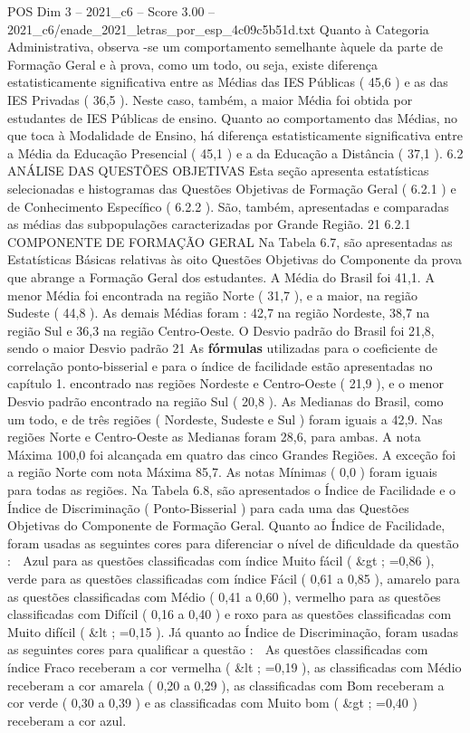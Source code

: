 \begin{textsample}{POS Dim 3 – 2021\_c6 – Score 3.00 – 2021\_c6/enade\_2021\_letras\_por\_esp\_4c09c5b51d.txt}
Quanto à Categoria Administrativa, observa -se um comportamento semelhante àquele da parte de Formação Geral e à prova, como um todo, ou seja, existe diferença estatisticamente significativa entre as Médias das IES Públicas ( 45,6 ) e as das IES Privadas ( 36,5 ).
Neste caso, também, a maior Média foi obtida por estudantes de IES Públicas de ensino.
Quanto ao comportamento das Médias, no que toca à Modalidade de Ensino, há diferença estatisticamente significativa entre a Média da Educação Presencial ( 45,1 ) e a da Educação a Distância ( 37,1 ). 6.2 ANÁLISE DAS QUESTÕES OBJETIVAS Esta seção apresenta estatísticas selecionadas e histogramas das Questões Objetivas de Formação Geral ( 6.2.1 ) e de Conhecimento Específico ( 6.2.2 ).
São, também, apresentadas e comparadas as médias das subpopulações caracterizadas por Grande Região. 21 6.2.1 COMPONENTE DE FORMAÇÃO GERAL Na Tabela 6.7, são apresentadas as Estatísticas Básicas relativas às oito Questões Objetivas do Componente da prova que abrange a Formação Geral dos estudantes.
A Média do Brasil foi 41,1.
A menor Média foi encontrada na região Norte ( 31,7 ), e a maior, na região Sudeste ( 44,8 ).
As demais Médias foram : 42,7 na região Nordeste, 38,7 na região Sul e 36,3 na região Centro-Oeste.
O Desvio padrão do Brasil foi 21,8, sendo o maior Desvio padrão 21 As \textbf{fórmulas} utilizadas para o coeficiente de correlação ponto-bisserial e para o índice de facilidade estão apresentadas no capítulo 1. encontrado nas regiões Nordeste e Centro-Oeste ( 21,9 ), e o menor Desvio padrão encontrado na região Sul ( 20,8 ).
As Medianas do Brasil, como um todo, e de três regiões ( Nordeste, Sudeste e Sul ) foram iguais a 42,9.
Nas regiões Norte e Centro-Oeste as Medianas foram 28,6, para ambas.
A nota Máxima 100,0 foi alcançada em quatro das cinco Grandes Regiões.
A exceção foi a região Norte com nota Máxima 85,7.
As notas Mínimas ( 0,0 ) foram iguais para todas as regiões.
Na Tabela 6.8, são apresentados o Índice de Facilidade e o Índice de Discriminação ( Ponto-Bisserial ) para cada uma das Questões Objetivas do Componente de Formação Geral.
Quanto ao Índice de Facilidade, foram usadas as seguintes cores para diferenciar o nível de dificuldade da questão :  Azul para as questões classificadas com índice Muito fácil ( \&gt ; =0,86 ), verde para as questões classificadas com índice Fácil ( 0,61 a 0,85 ), amarelo para as questões classificadas com Médio ( 0,41 a 0,60 ), vermelho para as questões classificadas com Difícil ( 0,16 a 0,40 ) e roxo para as questões classificadas com Muito difícil ( \&lt ; =0,15 ).
Já quanto ao Índice de Discriminação, foram usadas as seguintes cores para qualificar a questão :  As questões classificadas com índice Fraco receberam a cor vermelha ( \&lt ; =0,19 ), as classificadas com Médio receberam a cor amarela ( 0,20 a 0,29 ), as classificadas com Bom receberam a cor verde ( 0,30 a 0,39 ) e as classificadas com Muito bom ( \&gt ; =0,40 ) receberam a cor azul.

\end{textsample}
